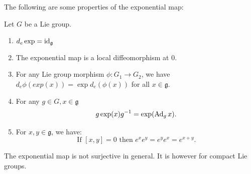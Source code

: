 \documentclass{report}
\begin{document}
The following are some properties of the exponential map:
\begin{theorem}
    Let $G$ be a Lie group.
    \begin{enumerate}[label = (\roman*)]
        \item $d_{e} \exp = \operatorname{id}_{\mathfrak g}$
        \item The exponential map is a local diffeomorphism at $0$.
        \item For any Lie group morphism $\phi:G_1 \to G_2$, we have $d_e \phi (exp(x)) = \exp d_e (\phi(x))$ for all $x\in \mathfrak g$.
        \item For any $g \in G, x \in \mathfrak g$
        \[
        g \exp(x) g^{-1} = \exp(\operatorname{Ad}_g x).
        \]
        \item For $x, y \in \mathfrak g$, we have:
        \[
        \text{If } [x,y] = 0 \text{ then } e^x e^y = e^y e^x = e^{x+y}.
        \]
    \end{enumerate}
\end{theorem}

\begin{remark}
    The exponential map is not surjective in general. It is however for compact Lie groups.
\end{remark}
\end{document}
